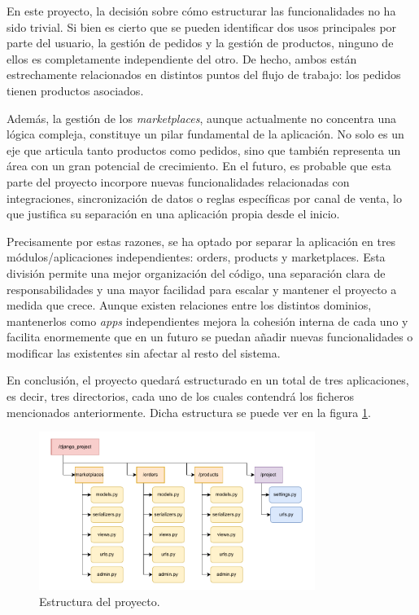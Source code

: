 En este proyecto, la decisión sobre cómo estructurar las funcionalidades no ha sido trivial. Si bien es cierto que se pueden identificar dos usos principales por parte del usuario, la gestión de pedidos y la gestión de productos, ninguno de ellos es completamente independiente del otro. De hecho, ambos están estrechamente relacionados en distintos puntos del flujo de trabajo: los pedidos tienen productos asociados.

Además, la gestión de los \textit{marketplaces}, aunque actualmente no concentra una lógica compleja, constituye un pilar fundamental de la aplicación. No solo es un eje que articula tanto productos como pedidos, sino que también representa un área con un gran potencial de crecimiento. En el futuro, es probable que esta parte del proyecto incorpore nuevas funcionalidades relacionadas con integraciones, sincronización de datos o reglas específicas por canal de venta, lo que justifica su separación en una aplicación propia desde el inicio.

Precisamente por estas razones, se ha optado por separar la aplicación en tres módulos/aplicaciones independientes: orders, products y marketplaces. Esta división permite una mejor organización del código, una separación clara de responsabilidades y una mayor facilidad para escalar y mantener el proyecto a medida que crece. Aunque existen relaciones entre los distintos dominios, mantenerlos como \textit{apps} independientes mejora la cohesión interna de cada uno y facilita enormemente que en un futuro se puedan añadir nuevas funcionalidades o modificar las existentes sin afectar al resto del sistema.

En conclusión, el proyecto quedará estructurado en un total de tres aplicaciones, es decir, tres directorios, cada uno de los cuales contendrá los ficheros mencionados anteriormente. Dicha estructura se puede ver en la figura \ref{dev:fig:estructura_proyecto}.

\begin{figure}[H]
    \centering
    \includegraphics[width=0.8\textwidth]{figures/design_develop/estructura_proyecto.pdf}
    \caption{Estructura del proyecto.}
    \label{dev:fig:estructura_proyecto}
\end{figure}

